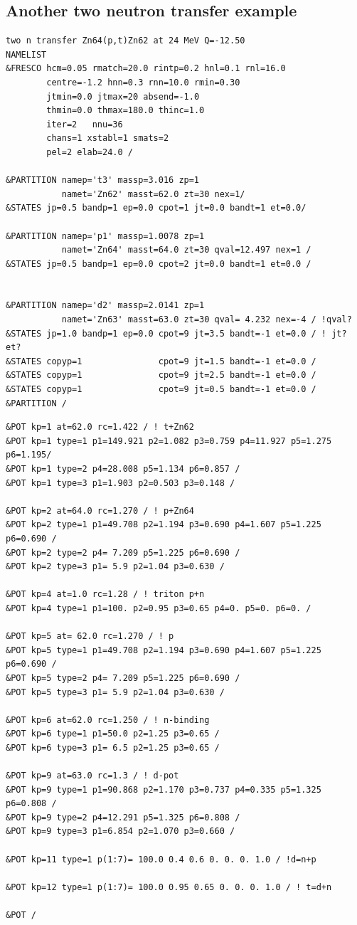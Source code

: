 \documentclass[11pt]{book}
\begin{document}
\subsection{Another two neutron transfer example}
\begin{small} \begin{lstlisting}[frame=single]
two n transfer Zn64(p,t)Zn62 at 24 MeV Q=-12.50
NAMELIST
&FRESCO hcm=0.05 rmatch=20.0 rintp=0.2 hnl=0.1 rnl=16.0
        centre=-1.2 hnn=0.3 rnn=10.0 rmin=0.30
        jtmin=0.0 jtmax=20 absend=-1.0
        thmin=0.0 thmax=180.0 thinc=1.0
        iter=2   nnu=36
        chans=1 xstabl=1 smats=2
        pel=2 elab=24.0 /

&PARTITION namep='t3' massp=3.016 zp=1 
           namet='Zn62' masst=62.0 zt=30 nex=1/
&STATES jp=0.5 bandp=1 ep=0.0 cpot=1 jt=0.0 bandt=1 et=0.0/

&PARTITION namep='p1' massp=1.0078 zp=1 
           namet='Zn64' masst=64.0 zt=30 qval=12.497 nex=1 /
&STATES jp=0.5 bandp=1 ep=0.0 cpot=2 jt=0.0 bandt=1 et=0.0 /


&PARTITION namep='d2' massp=2.0141 zp=1
           namet='Zn63' masst=63.0 zt=30 qval= 4.232 nex=-4 / !qval?
&STATES jp=1.0 bandp=1 ep=0.0 cpot=9 jt=3.5 bandt=-1 et=0.0 / ! jt? et?    
&STATES copyp=1               cpot=9 jt=1.5 bandt=-1 et=0.0 /     
&STATES copyp=1               cpot=9 jt=2.5 bandt=-1 et=0.0 /     
&STATES copyp=1               cpot=9 jt=0.5 bandt=-1 et=0.0 /     
&PARTITION /
\end{lstlisting}\end{small}
\begin{small} \begin{lstlisting}[frame=single]
&POT kp=1 at=62.0 rc=1.422 / ! t+Zn62
&POT kp=1 type=1 p1=149.921 p2=1.082 p3=0.759 p4=11.927 p5=1.275 p6=1.195/
&POT kp=1 type=2 p4=28.008 p5=1.134 p6=0.857 /
&POT kp=1 type=3 p1=1.903 p2=0.503 p3=0.148 /

&POT kp=2 at=64.0 rc=1.270 / ! p+Zn64
&POT kp=2 type=1 p1=49.708 p2=1.194 p3=0.690 p4=1.607 p5=1.225 p6=0.690 /
&POT kp=2 type=2 p4= 7.209 p5=1.225 p6=0.690 /
&POT kp=2 type=3 p1= 5.9 p2=1.04 p3=0.630 /

&POT kp=4 at=1.0 rc=1.28 / ! triton p+n 
&POT kp=4 type=1 p1=100. p2=0.95 p3=0.65 p4=0. p5=0. p6=0. /

&POT kp=5 at= 62.0 rc=1.270 / ! p
&POT kp=5 type=1 p1=49.708 p2=1.194 p3=0.690 p4=1.607 p5=1.225 p6=0.690 /
&POT kp=5 type=2 p4= 7.209 p5=1.225 p6=0.690 /
&POT kp=5 type=3 p1= 5.9 p2=1.04 p3=0.630 /

&POT kp=6 at=62.0 rc=1.250 / ! n-binding
&POT kp=6 type=1 p1=50.0 p2=1.25 p3=0.65 /
&POT kp=6 type=3 p1= 6.5 p2=1.25 p3=0.65 /

&POT kp=9 at=63.0 rc=1.3 / ! d-pot
&POT kp=9 type=1 p1=90.868 p2=1.170 p3=0.737 p4=0.335 p5=1.325 p6=0.808 /
&POT kp=9 type=2 p4=12.291 p5=1.325 p6=0.808 /
&POT kp=9 type=3 p1=6.854 p2=1.070 p3=0.660 /

&POT kp=11 type=1 p(1:7)= 100.0 0.4 0.6 0. 0. 0. 1.0 / !d=n+p

&POT kp=12 type=1 p(1:7)= 100.0 0.95 0.65 0. 0. 0. 1.0 / ! t=d+n

&POT /
\end{lstlisting}\end{small}
\end{document}
